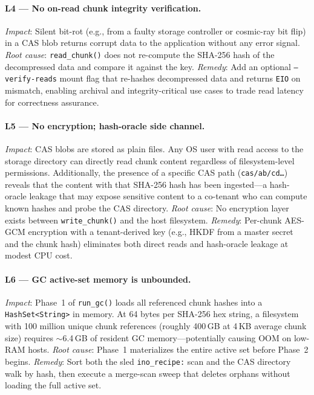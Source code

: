 \documentclass[5p,times]{elsarticle}
\begin{document}
\paragraph{L4 --- No on-read chunk integrity verification.}
\textit{Impact}: Silent bit-rot (e.g., from a faulty storage controller or
cosmic-ray bit flip) in a CAS blob returns corrupt data to the application
without any error signal.  \textit{Root cause}: \texttt{read\_chunk()}
does not re-compute the SHA-256 hash of the decompressed data and compare
it against the key.  \textit{Remedy}: Add an optional
\texttt{--verify-reads} mount flag that re-hashes decompressed data and
returns \texttt{EIO} on mismatch, enabling archival and integrity-critical
use cases to trade read latency for correctness assurance.

\paragraph{L5 --- No encryption; hash-oracle side channel.}
\textit{Impact}: CAS blobs are stored as plain files.  Any OS user
with read access to the storage directory can directly read chunk content
regardless of filesystem-level permissions.  Additionally, the presence
of a specific CAS path (\texttt{cas/ab/cd\ldots}) reveals that the
content with that SHA-256 hash has been ingested---a hash-oracle leakage
that may expose sensitive content to a co-tenant who can compute known
hashes and probe the CAS directory.  \textit{Root cause}: No encryption
layer exists between \texttt{write\_chunk()} and the host filesystem.
\textit{Remedy}: Per-chunk AES-GCM encryption with a tenant-derived key
(e.g., HKDF from a master secret and the chunk hash) eliminates both
direct reads and hash-oracle leakage at modest CPU cost.

\paragraph{L6 --- GC active-set memory is unbounded.}
\textit{Impact}: Phase~1 of \texttt{run\_gc()} loads all referenced
chunk hashes into a \texttt{HashSet\textless{}String\textgreater{}} in
memory.  At 64 bytes per SHA-256 hex string, a filesystem with 100
million unique chunk references (roughly 400\,GB at 4\,KB average chunk
size) requires $\sim$6.4\,GB of resident GC memory---potentially causing
OOM on low-RAM hosts.  \textit{Root cause}: Phase~1 materializes the
entire active set before Phase~2 begins.  \textit{Remedy}: Sort both
the sled \texttt{ino\_recipe:} scan and the CAS directory walk by hash,
then execute a merge-scan sweep that deletes orphans without loading the
full active set.
\end{document}
